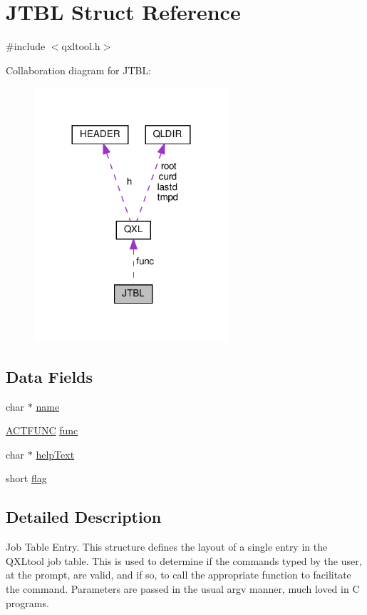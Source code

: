 \hypertarget{struct_j_t_b_l}{}\section{J\+T\+BL Struct Reference}
\label{struct_j_t_b_l}


{\ttfamily \#include $<$qxltool.\+h$>$}



Collaboration diagram for J\+T\+BL\+:\nopagebreak
\begin{figure}[H]
\begin{center}
\leavevmode
\includegraphics[width=204pt]{struct_j_t_b_l__coll__graph}
\end{center}
\end{figure}
\subsection*{Data Fields}
\begin{DoxyCompactItemize}
\item 
char $\ast$ \hyperlink{struct_j_t_b_l_a5ac083a645d964373f022d03df4849c8}{name}
\item 
\hyperlink{qxltool_8h_a1aef0e7b7f81adb7442c3e9e8fc2d111}{A\+C\+T\+F\+U\+NC} \hyperlink{struct_j_t_b_l_ae6a382beea3f6271f4275fcda5612a65}{func}
\item 
char $\ast$ \hyperlink{struct_j_t_b_l_ac1830353e983a2f22f664cd25d13edf7}{help\+Text}
\item 
short \hyperlink{struct_j_t_b_l_a9872aee74ba489115d3dd6e1f29ca874}{flag}
\end{DoxyCompactItemize}


\subsection{Detailed Description}
Job Table Entry. This structure defines the layout of a single entry in the Q\+X\+Ltool job table. This is used to determine if the commands typed by the user, at the prompt, are valid, and if so, to call the appropriate function to facilitate the command. Parameters are passed in the usual \textquotesingle{}argv\textquotesingle{} manner, much loved in C programs. 

